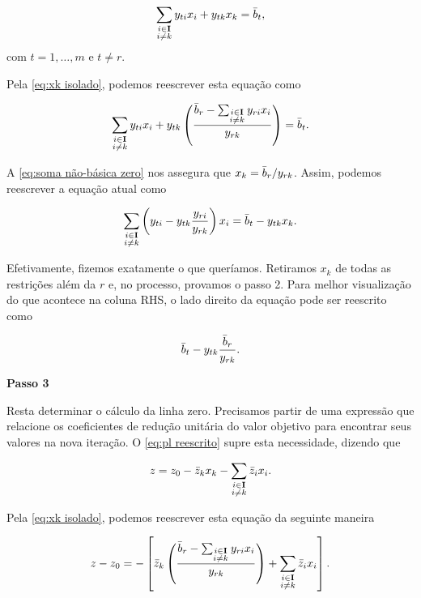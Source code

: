 \begin{equation}
    \sum_{\substack{i \in  \vb I \\ i \neq k}}{ y_{ti}x_{i}} +  y_{tk}x_{k} = \bar{b}_{t},
\end{equation}
com $t = 1,\ldots,m$ e $t \neq r$.

Pela \cref{eq:xk isolado}, podemos reescrever esta equação como

\begin{equation}
    \sum_{\substack{i \in  \vb I \\ i \neq k}}{ y_{ti}x_{i}} +  y_{tk}\left(\frac{\bar{b}_{r} - \sum_{\substack{i \in  \vb I \\ i \neq k}}{ y_{ri}x_{i}}}{ y_{rk}}\right) = \bar{b}_{t}.
\end{equation}

A \cref{eq:soma não-básica zero} nos assegura que $x_{k} = \bar{b}_{r}/ y_{rk}$. Assim, podemos reescrever a equação atual como

\begin{equation}
    \sum_{\substack{i \in  \vb I \\ i \neq k}}{\left( y_{ti} -  y_{tk}\frac{ y_{ri}}{ y_{rk}}\right)x_{i}} = \bar{b}_{t} -  y_{tk}x_{k}.
\end{equation}

Efetivamente, fizemos exatamente o que queríamos. Retiramos $x_{k}$ de todas as restrições além da $r$ e, no processo, provamos o passo 2. Para melhor visualização do que acontece na coluna RHS, o lado direito da equação pode ser reescrito como

\begin{equation}
    \bar{b}_{t} -  y_{tk}\frac{\bar{b}_{r}}{ y_{rk}}.
\end{equation}

\textbf{Passo 3}

Resta determinar o cálculo da linha zero. Precisamos partir de uma expressão que relacione os coeficientes de redução unitária do valor objetivo para encontrar seus valores na nova iteração. O \cref{eq:pl reescrito} supre esta necessidade, dizendo que

\begin{equation}
    z = z_0 - \bar{z}_{k}x_{k} - \sum_{\substack{i \in  \vb I \\ i \neq k}}{\bar{z}_{i}x_{i}}.
\end{equation}

Pela \cref{eq:xk isolado}, podemos reescrever esta equação da seguinte maneira

\begin{equation}
    z - z_0 = - \left[\bar{z}_{k}\left(\frac{\bar{b}_{r} - \sum_{\substack{i \in  \vb I \\ i \neq k}}{ y_{ri}x_{i}}}{ y_{rk}}\right) + \sum_{\substack{i \in  \vb I \\ i \neq k}}{\bar{z}_{i}x_{i}}\right].
\end{equation}

